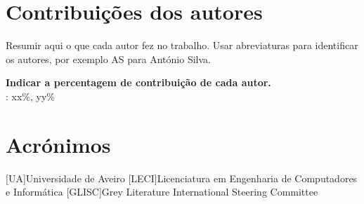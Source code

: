 \documentclass{report}
\begin{document}
\chapter*{Contribuições dos autores}
Resumir aqui o que cada autor fez no trabalho.
Usar abreviaturas para identificar os autores,
por exemplo AS para António Silva.

\vspace{10pt}
\textbf{Indicar a percentagem de contribuição de cada autor.}\\

\autoresacronimos : xx\%, yy\%\\


\chapter*{Acrónimos}
\begin{acronym}
[UA]{Universidade de Aveiro}
[LECI]{Licenciatura em Engenharia de Computadores e Informática}
[GLISC]{Grey Literature International Steering Committee}
\end{acronym}


\printbibliography
\end{document}
